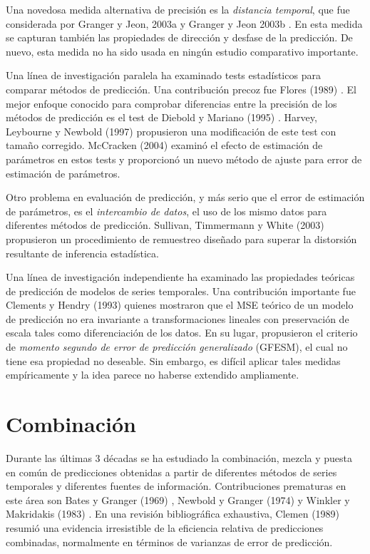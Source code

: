 \documentclass{llncs}
\begin{document}
Una novedosa medida alternativa de precisión es la \emph{distancia temporal}, que fue considerada por Granger y Jeon, 2003a \cite{Granger2003199} y Granger y Jeon 2003b \cite{Granger2003339}. En esta medida se capturan también  las propiedades de dirección y desfase de la predicción. De nuevo, esta medida no ha sido usada en ningún estudio comparativo importante.

Una línea de investigación paralela ha examinado tests estadísticos para comparar métodos de predicción. Una contribución precoz fue Flores (1989) \cite{Flores1989529}. El mejor enfoque conocido para comprobar diferencias entre la precisión de los métodos de predicción es el test de Diebold y Mariano (1995) \cite{Diebold1995253}. Harvey, Leybourne y Newbold (1997) \cite{Harvey1997281} propusieron una modificación de este test con tamaño corregido. McCracken (2004) \cite{McCracken2004503} examinó el efecto de estimación de parámetros en estos tests y proporcionó un nuevo método de ajuste para error de estimación de parámetros.

Otro problema en evaluación de predicción, y más serio que el error de estimación de parámetros, es el \emph{intercambio de datos}, el uso de los mismo datos para diferentes métodos de predicción. Sullivan, Timmermann y White (2003) \cite{Sullivan2003217} propusieron un procedimiento de remuestreo diseñado para superar la distorsión resultante de inferencia estadística.

Una línea de investigación independiente ha examinado las propiedades teóricas de predicción de modelos de series temporales. Una contribución importante fue Clements y Hendry (1993) \cite{Clements1993617} quienes mostraron que el MSE teórico de un modelo de predicción no era invariante a transformaciones lineales con preservación de escala tales como diferenciación de los datos. En su lugar, propusieron el criterio de \emph{momento segundo de error de predicción generalizado} (GFESM), el cual no tiene esa propiedad no deseable. Sin embargo, es difícil aplicar tales medidas empíricamente y la idea parece no haberse extendido ampliamente.

\section{Combinación}
Durante las últimas 3 décadas se ha estudiado la combinación, mezcla y puesta en común de predicciones obtenidas a partir de diferentes métodos de series temporales y diferentes fuentes de información. Contribuciones prematuras en este área son Bates y Granger (1969) \cite{BATESJM1969451}, Newbold y Granger (1974) \cite{Newbold1974131} y Winkler y Makridakis (1983) \cite{Winkler1983150}. En una revisión bibliográfica exhaustiva, Clemen (1989) \cite{Clemen1989559} resumió una evidencia irresistible de la eficiencia relativa de predicciones combinadas, normalmente en términos de varianzas de error de predicción.
\end{document}
